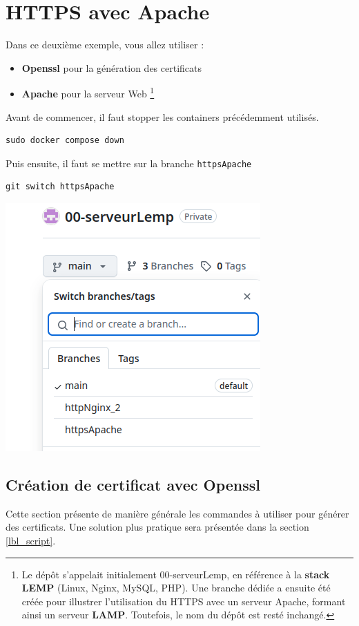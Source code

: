 \documentclass[french, 12pt]{article}%
\newcommand{\itemE}{\item[$\bullet$]}
\begin{document}
\section{HTTPS avec Apache}
Dans ce deuxième exemple, vous allez utiliser  :
 \begin{itemize}
 \itemE \textbf{Openssl} pour la génération des certificats
 \itemE \textbf{Apache} pour la serveur Web \footnote{Le dépôt s’appelait initialement 00-serveurLemp, en référence à la \textbf{stack LEMP} (Linux, Nginx, MySQL, PHP). Une branche dédiée a ensuite été créée pour illustrer l’utilisation du HTTPS avec un serveur Apache, formant ainsi un serveur \textbf{LAMP}. Toutefois, le nom du dépôt est resté inchangé.}
 \end{itemize}

Avant de commencer, il faut stopper les containers précédemment utilisés. 
\begin{lstlisting}[style=commande]
sudo docker compose down
\end{lstlisting}

Puis ensuite, il faut se mettre sur la branche \verb?httpsApache ?
\begin{lstlisting}[style=commande]
git switch httpsApache 
\end{lstlisting}

\begin{center}
\includegraphics[scale=0.5]{./ressource/branchServeurLemp}
\end{center}

\subsection{Création de certificat avec Openssl}
Cette section présente de manière générale les commandes à utiliser pour générer des certificats. Une solution plus pratique sera présentée dans la section \ref{lbl_script}.
\end{document}
